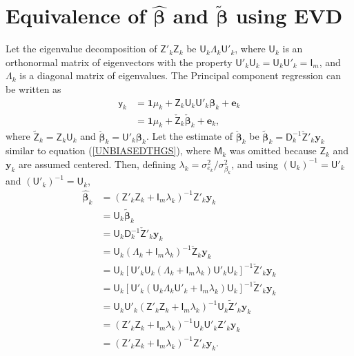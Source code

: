 \documentclass{bmcart}
\newcommand{\vecx}{\boldsymbol}
\newcommand{\mat}[1]{\boldsymbol{\mathsf{#1}}}
\begin{document}
\section{Equivalence of $\hat{\vecx{\beta}}$ and $\tilde{\vecx{\beta}}$ using EVD} \label{ExactTH}

Let the eigenvalue decomposition of $\mat{Z}'_k\mat{Z}_k$ be
$\mat{U}_k\mat{\Lambda}_k\mat{U}'_k$, where $\mat{U}_k$ is an orthonormal matrix of eigenvectors with the property $\mat{U}'_k\mat{U}_k = \mat{U}_k\mat{U}'_k = \mat{I}_m$, and $\mat{\Lambda}_k$ is a diagonal matrix of eigenvalues. The Principal component regression \cite{StatLearn} can be written as
\begin{align*}
    \mat{y}_k &= \vecx{1}\mu_k + \mat{Z}_k\mat{U}_k\mat{U}'_k\vecx{\beta}_k + \vecx{e}_k\\
    &= \vecx{1}\mu_k +\check{\mat{Z}}_k\check{\vecx{\beta}}_k + \vecx{e}_k,
\end{align*}
where $\tilde{\mat{Z}}_k = \mat{Z}_k\mat{U}_k$ and $\check{\vecx{\beta}}_k = \mat{U}'_k\vecx{\beta}_k$. Let the estimate of $\check{\vecx{\beta}}_k$ be $\tilde{\vecx{\beta}}_k = \mat{D}^{-1}_k\check{\mat{Z}}'_k\vecx{y}_k$ similar to equation (\ref{UNBIASEDTHGS}), where $\mat{M}_k$ was omitted because $\mat{Z}_k$ and $\vecx{y}_k$ are assumed centered. Then, defining $\lambda_k = \sigma^2_{e_k}/\sigma^2_{\beta_k}$, and using $(\mat{U}_k)^{-1} = \mat{U}'_k$ and $(\mat{U}'_k)^{-1} = \mat{U}_k$,
\begin{align*}
    \hat{\vecx{\beta}}_k &= (\mat{Z}'_k\mat{Z}_k + \mat{I}_m\lambda_k)^{-1}\mat{Z}'_k\vecx{y}_k\\
    &= \mat{U}_k\tilde{\vecx{\beta}}_k\\
    &= \mat{U}_k\mat{D}^{-1}_k\check{\mat{Z}}'_k\vecx{y}_k\\
    &= \mat{U}_k(\mat{\Lambda}_k+\mat{I}_m\lambda_k)^{-1}\check{\mat{Z}}_k\vecx{y}_k\\
    &= \mat{U}_k[\mat{U}'_k\mat{U}_k(\mat{\Lambda}_k+\mat{I}_m\lambda_k)\mat{U}'_k\mat{U}_k]^{-1}\check{\mat{Z}}'_k\vecx{y}_k\\
    &= \mat{U}_k[\mat{U}'_k(\mat{U}_k\mat{\Lambda}_k\mat{U}'_k+\mat{I}_m\lambda_k)\mat{U}_k]^{-1}\check{\mat{Z}}'_k\vecx{y}_k\\
    &= \mat{U}_k\mat{U}'_k(\mat{Z}'_k\mat{Z}_k+\mat{I}_m\lambda_k)^{-1}\mat{U}_k\tilde{\mat{Z}}'_k\vecx{y}_k\\
    &= (\mat{Z}'_k\mat{Z}_k+\mat{I}_m\lambda_k)^{-1}\mat{U}_k\mat{U}'_k\mat{Z}'_k\vecx{y}_k\\
    &= (\mat{Z}'_k\mat{Z}_k+\mat{I}_m\lambda_k)^{-1}\mat{Z}'_k\vecx{y}_k.
\end{align*}
\end{document}
